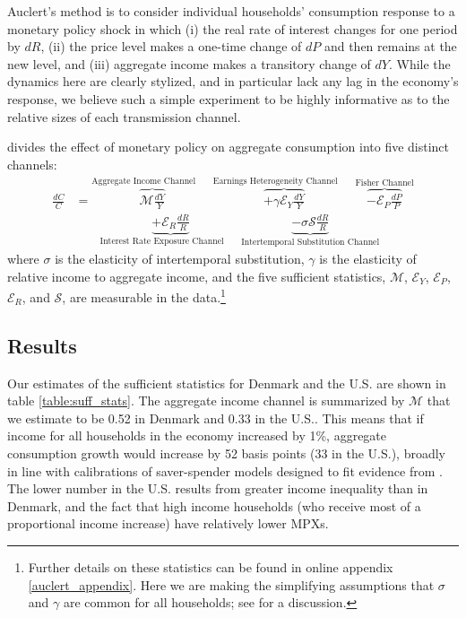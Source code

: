 \documentclass[titlepage]{\econtex}\newcommand{\texname}{ConsumptionHeterogeneity}
\begin{document}
	Auclert's method is to consider individual households' consumption response to a monetary policy shock in which (i) the real rate of interest changes for one period by $dR$, (ii) the price level makes a one-time change of $dP$ and then remains at the new level, and (iii) aggregate income makes a transitory change of $dY$. While the dynamics here are clearly stylized, and in particular lack any lag in the economy's response, we believe such a simple experiment to be highly informative as to the relative sizes of each transmission channel.
	
	\cite{auclert_monetary_2017} divides the effect of monetary policy on aggregate consumption into five distinct channels:
	\begingroup
	\allowdisplaybreaks[0]
	\begin{align} 
	\frac{dC}{C} &= \overbrace{\mathcal{M}\frac{dY}{Y}}^{\text{Aggregate Income Channel}\qquad} \overbrace{ + \gamma \mathcal{E}_Y \frac{dY}{Y}}^{\text{Earnings Heterogeneity Channel}\qquad} \overbrace{ - \mathcal{E}_P\frac{dP}{P}}^{\text{Fisher Channel}}  \nonumber \\
	& \qquad \underbrace{ + \mathcal{E}_R \frac{dR}{R}}_{\text{Interest Rate Exposure Channel}\qquad}  \underbrace{ - \sigma \mathcal{S}\frac{dR}{R}}_{\text{Intertemporal Substitution Channel}} \label{auclert_channels}
	\end{align}
	\endgroup
	where $\sigma$ is the elasticity of intertemporal substitution, $\gamma$ is the elasticity of relative income to aggregate income, and the five sufficient statistics, $\mathcal{M}$, $\mathcal{E}_Y$, $\mathcal{E}_P$, $\mathcal{E}_R$, and $\mathcal{S}$, are measurable in the data.\footnote{Further details on these statistics can be found in online appendix \ref{auclert_appendix}. Here we are making the simplifying assumptions that $\sigma$ and $\gamma$ are common for all households; see \cite{auclert_monetary_2017} for a discussion.}
	
	\subsection{Results}
	Our estimates of the sufficient statistics for Denmark and the U.S. are shown in table \ref{table:suff_stats}. The aggregate income channel is summarized by $\mathcal{M}$ that we estimate to be 0.52 in Denmark and 0.33 in the U.S.. This means that if income for all households in the economy increased by 1\%, aggregate consumption growth would increase by 52 basis points (33 in the U.S.), broadly in line with calibrations of saver-spender models designed to fit evidence from \cite{campbell_consumption_1989}. The lower number in the U.S. results from greater income inequality than in Denmark, and the fact that high income households (who receive most of a proportional income increase) have relatively lower MPXs.
	
\end{document}
